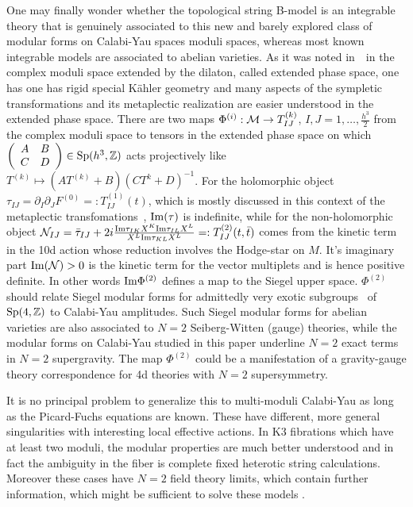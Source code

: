 \documentclass[12pt]{article}
\begin{document}
One may finally wonder whether the topological string B-model is
an integrable theory that is genuinely associated to this new and
barely explored class of modular forms on Calabi-Yau spaces moduli
spaces, whereas most known integrable models are associated to
abelian varieties. As it was noted
in~\cite{Verlinde:2004ck,Aganagic:2006wq, Gunaydin:2006bz}~in the
complex moduli space extended by the dilaton, called extended
phase space, one has one has rigid special K\"ahler geometry and
many aspects of the sympletic transformations and its metaplectic
realization are easier understood in the extended phase space.
There are two maps $\Phi^{(i)}: {\cal M}\rightarrow T^{(k)}_{IJ}$,
$I,J=1,\ldots,\frac{h^3}{2}$ from the complex moduli space to
tensors in the extended phase space on which
$\left(\begin{array}{cc} A&B\\ C&D \end{array}\right)\in {\rm Sp}
(h^3,\mathbb{Z})$ acts projectively like $T^{(k)}\mapsto (A
T^{(k)}+B)(C T^{k}+D)^{-1}$. For the holomorphic object
$\tau_{IJ}=\partial_I \partial_J F^{(0)}=:T^{(1)}_{IJ}(t)$, which is 
mostly discussed in this
context of the metaplectic transfomations~\cite{Verlinde:2004ck,
Aganagic:2006wq,Gunaydin:2006bz}, ${\rm Im}(\tau)$ is indefinite,
while for the non-holomorphic object ${\cal N}_{IJ}={\bar
\tau}_{IJ}+ 2 i \frac{{\rm Im}\tau_{IK} X^K {\rm Im}\tau_{IL}
X^L}{X^L{\rm Im}\tau_{KL} X^L} =:T^{(2)}_{IJ}(t,\bar t)$ comes
from the kinetic term in the 10d action whose reduction involves
the Hodge-star on $M$. It's imaginary  part ${\rm Im}({\cal N})>0$
is the kinetic term for the vector multiplets and is  hence
positive definite. In other words ${\rm Im}\Phi^{(2)}$ defines a
map to the Siegel upper space. $\Phi^{(2)}$ should relate Siegel
modular forms for admittedly very exotic subgroups~\cite{cyy} of
${\rm Sp}(4,\mathbb{Z})$ to Calabi-Yau amplitudes. Such Siegel
modular forms for abelian varieties  are also associated to $N=2$
Seiberg-Witten (gauge) theories, while the modular forms on
Calabi-Yau studied in this paper underline $N=2$ exact terms in
$N=2$ supergravity. The map $\Phi^{(2)}$ could be a manifestation
of a gravity-gauge theory correspondence for 4d theories with
$N=2$ supersymmetry.


It is no principal problem to generalize this to multi-moduli Calabi-Yau as
long as the Picard-Fuchs equations are known. These have different, more
general singularities with interesting local effective actions. In
K3 fibrations which have at least two moduli, the modular properties are much
better understood and in fact the ambiguity in the fiber is
complete fixed heterotic string calculations. Moreover these cases
have $N=2$ field theory limits, which contain further information,
which might be sufficient to solve these models \cite{GKMW}.
\end{document}
